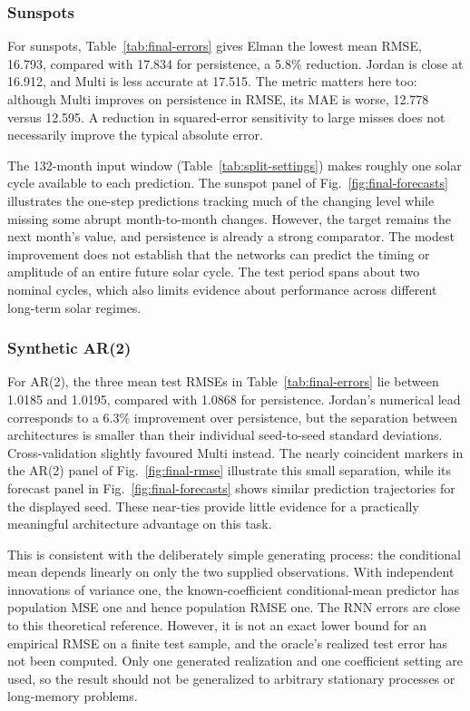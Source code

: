 \subsubsection{Sunspots}
For sunspots, Table~\ref{tab:final-errors} gives Elman the lowest mean RMSE,
16.793, compared with 17.834 for persistence, a 5.8\% reduction. Jordan is close
at 16.912, and Multi is less accurate at 17.515. The metric matters here too:
although Multi improves on persistence in RMSE, its MAE is worse, 12.778 versus
12.595. A reduction in squared-error sensitivity to large misses does not
necessarily improve the typical absolute error.

The 132-month input window (Table~\ref{tab:split-settings}) makes roughly one
solar cycle available to each prediction. The sunspot panel of
Fig.~\ref{fig:final-forecasts} illustrates the one-step predictions tracking
much of the changing level while missing some abrupt month-to-month changes.
However, the target remains the next month's value, and persistence is already a
strong comparator. The modest improvement does not establish that the networks
can predict the timing or amplitude of an entire future solar cycle. The test
period spans about two nominal cycles, which also limits evidence about
performance across different long-term solar regimes.

\subsubsection{Synthetic AR(2)}
For AR(2), the three mean test RMSEs in Table~\ref{tab:final-errors} lie between
1.0185 and 1.0195, compared with 1.0868 for persistence. Jordan's numerical lead
corresponds to a 6.3\% improvement over persistence, but the separation between
architectures is smaller than their individual seed-to-seed standard deviations.
Cross-validation slightly favoured Multi instead. The nearly coincident markers
in the AR(2) panel of Fig.~\ref{fig:final-rmse} illustrate this small
separation, while its forecast panel in Fig.~\ref{fig:final-forecasts} shows
similar prediction trajectories for the displayed seed. These near-ties provide
little evidence for a practically meaningful architecture advantage on this
task.

This is consistent with the deliberately simple generating process: the
conditional mean depends linearly on only the two supplied observations. With
independent innovations of variance one, the known-coefficient conditional-mean
predictor has population MSE one and hence population RMSE one. The RNN errors
are close to this theoretical reference. However, it is not an exact lower bound
for an empirical RMSE on a finite test sample, and the oracle's realized test
error has not been computed. Only one generated realization and one coefficient
setting are used, so the result should not be generalized to arbitrary
stationary processes or long-memory problems.


